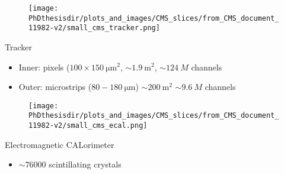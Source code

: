 \begin{frame}
\addtocounter{framenumber}{-1}
\transdissolve
\begin{minipage}[t]{.6\textwidth}
\begin{figure}
\texttt{[image: \\PhDthesisdir/plots\_and\_images/CMS\_slices/from\_CMS\_document\_11982-v2/small\_cms\_tracker.png]}
\end{figure}
\end{minipage}
\hfill\begin{minipage}[t]{.35\textwidth}
\begin{block}{Tracker}
\begin{itemize}
\item Inner: pixels ($\num{100}\times\SI{150}{\micro\meter^2}$, $\sim\SI{1.9}{\meter^2}$, $\sim\SI{124}{M}$ channels
\item Outer: microstrips ($\num{80}-\SI{180}{\micro\meter}$) $\sim\SI{200}{\meter^2}$ $\sim\SI{9.6}{M}$ channels
\end{itemize}
\end{block}
\end{minipage}
\end{frame}

\begin{frame}
\addtocounter{framenumber}{-1}
\transdissolve
\begin{minipage}[t]{.6\textwidth}
\begin{figure}
\texttt{[image: \\PhDthesisdir/plots\_and\_images/CMS\_slices/from\_CMS\_document\_11982-v2/small\_cms\_ecal.png]}
\end{figure}
\end{minipage}
\hfill\begin{minipage}[t]{.35\textwidth}
\begin{block}{Electromagnetic CALorimeter}
\begin{itemize}
\item $\sim\num{76000}$ scintillating  crystals
\end{itemize}
\end{block}
\end{minipage}
\end{frame}

